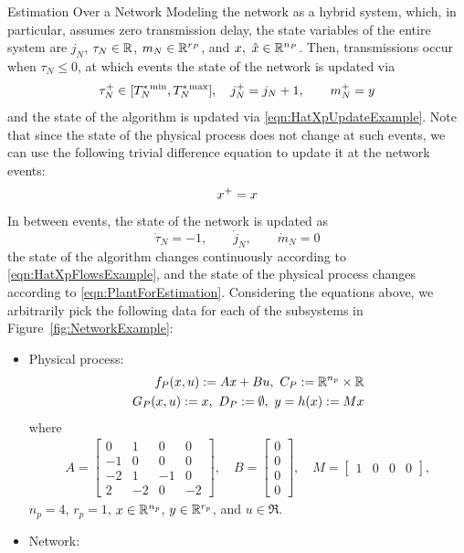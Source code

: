 \begin{example}{Estimation Over a Network}
Modeling the network as a hybrid system,
which, in particular, assumes zero transmission delay,
the state variables of the entire system are 
$j_N$, $\tau_N \in {\mathbb R}$, $m_N \in {\mathbb R}^{r_P}$, and $x,\ \hat{x}\in {\mathbb R}^{n_P}$.  
Then, transmissions occur when $\tau_N \leq 0$, 
at which events the state of the network is updated via
$$
\tau_N^+ \in [T^{*\min}_{N},T^{*\max}_{N}],\quad j_N^+ = j_N+1, \qquad m_N^+ = y
$$
and the state of the algorithm is updated via \eqref{eqn:HatXpUpdateExample}.
Note that since the state of the physical process does not change at such
events, we can use the following trivial difference equation to update it at the
network events:
$$
x^+ = x
$$
In between events, the state of the network is updated as
$$
\dot{\tau}_N = -1, \qquad \dot{j}_N, \qquad \dot{m}_N = 0
$$
the state of the algorithm changes continuously according to \eqref{eqn:HatXpFlowsExample}, and the 
state of the physical process changes according to \eqref{eqn:PlantForEstimation}.
Considering the equations above, we arbitrarily pick the following data for each of the subsystems in Figure~\ref{fig:NetworkExample}:

\begin{itemize}
\item Physical process:
\begin{eqnarray}
\fp(\xp, u):= A\xp + Bu,\ 
   \Cp : = \Re^{n_p}\times\Re\\
\gp(\xp, u):= \xp,\ 
    \Dp: =\emptyset,\ 
\yp = h(\xp) : =M\xp
\end{eqnarray}
where 
\begin{align}
A = 
\begin{bmatrix} 
0&1&0&0\\
-1&0&0&0\\
-2&1&-1&0\\
2&-2&0&-2
\end{bmatrix},\quad
B = \begin{bmatrix} 0\\0\\0\\0 \end{bmatrix},\quad
M = \begin{bmatrix}1&0&0&0\end{bmatrix},
\end{align}
$n_p=4$, $r_p=1$, $x \in{\mathbb R}^{n_p}$, $y\in{\mathbb R}^{r_p}$, and $u\in\Re$.

\item Network: 


\end{itemize}
\end{example}
